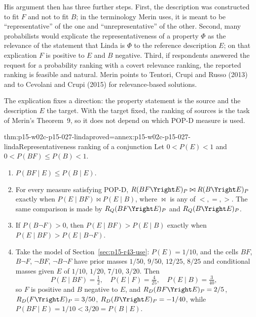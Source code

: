 His argument then has three further steps. First, the description was
constructed to fit \(F\) and not to fit \(B\); in the terminology
Merin uses, it is meant to be ``representative'' of the one and
``unrepresentative'' of the other. Second, many
probabilists would explicate the representativeness of a property
\(\Phi\) as the relevance of the statement that Linda is \(\Phi\) to the
reference description \(E\); on that explication \(F\) is positive to
\(E\) and \(B\) negative. Third, if respondents answered the request for
a probability ranking with a covert relevance ranking, the reported
ranking is feasible and natural. Merin points to Tentori, Crupi and
Russo (2013) and to Cevolani and Crupi (2015) for relevance-based
solutions.

The explication fixes a direction: the property statement is the source
and the description \(E\) the target. With the target fixed, the
ranking of sources is the task of Merin's Theorem~9, so it does not
depend on which POP-D measure is used.

\begin{hbtheorem}{thm:p15-w02c-p15-027-linda}{proved=annex:p15-w02c-p15-027-linda}{Representativeness ranking of a conjunction}
Let \(0<P(E)<1\) and \(0<P(BF)\leq P(B)<1\).
\begin{enumerate}
\item \(P(BF\mid E)\leq P(B\mid E)\).
\item For every measure satisfying POP-D,
  \(R(BF\Yright E)_P\bowtie R(B\Yright E)_P\) exactly when
  \(P(E\mid BF)\bowtie P(E\mid B)\), where \(\bowtie\) is any of
  \(<,=,>\). The same comparison is made by
  \(R_Q(BF\Yright E)_P\) and \(R_Q(B\Yright E)_P\).
\item If \(P(B\neg F)>0\), then \(P(E\mid BF)>P(E\mid B)\) exactly when
  \(P(E\mid BF)>P(E\mid B\neg F)\).
\item Take the model of Section~\ref{sec:p15-r43-use}: \(P(E)=1/10\),
  and the cells \(BF\), \(B\neg F\), \(\neg BF\), \(\neg B\neg F\) have
  prior masses \(1/50\), \(9/50\), \(12/25\), \(8/25\) and conditional
  masses given \(E\) of \(1/10\), \(1/20\), \(7/10\), \(3/20\). Then
  \[
   P(E\mid BF)=\tfrac12,\quad P(E\mid F)=\tfrac{4}{25},\quad
   P(E\mid B)=\tfrac{3}{40},
  \]
  so \(F\) is positive and \(B\) negative to \(E\), and
  \(R_D(BF\Yright E)_P=2/5\), \(R_D(F\Yright E)_P=3/50\),
  \(R_D(B\Yright E)_P=-1/40\), while
  \(P(BF\mid E)=1/10<3/20=P(B\mid E)\).
\end{enumerate}
\end{hbtheorem}

